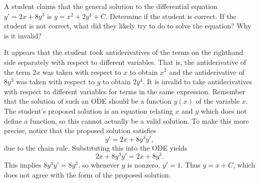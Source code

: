 \documentclass[noauthor,handout]{ximera}
\begin{document}
\begin{problem} 

A student claims that the  general solution to the differential equation $y' = 2x+8y^3$ is $y=x^2+2y^4+C$. Determine if the student is correct.  If the student is not correct, what did they likely try to do to solve the equation?  Why is it invalid?


\begin{freeResponse}
It appears that the student took antiderivatives of the terms on the righthand side separately with respect to different variables. That is, the antiderivative of the term $2x$ was taken with respect to $x$ to obtain $x^2$ and the antiderivative of $8y^3$ was taken with respect to $y$ to obtain $2y^4$. It is invalid to take antiderivatives with respect to different variables for terms in the same expression. Remember that the solution of such an ODE should be a function $y(x)$ of the variable $x$. The student's proposed solution is an equation relating $x$ and $y$ which does not define a function, so this cannot actually be a valid solution. To make this more precise, notice that the proposed solution satisfies
$$
y' = 2x + 8y^3 y',
$$
due to the chain rule. Substituting this into the ODE yields
$$
2x + 8y^3 y' = 2x + 8y^3.
$$
This implies $8y^3 y' = 8y^3$, so whenever $y$ is nonzero, $y'=1$. Thus $y = x + C$, which does not agree with the form of the proposed solution.

\end{freeResponse}
\end{problem}

 
\end{document}
